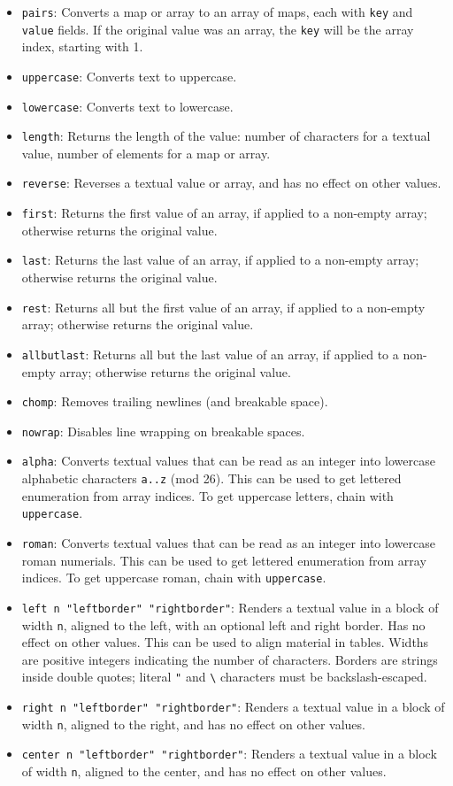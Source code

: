 \documentclass[]{article}
\begin{document}
\begin{itemize}
\item
  \texttt{pairs}: Converts a map or array to an array of maps, each with
  \texttt{key} and \texttt{value} fields. If the original value was an
  array, the \texttt{key} will be the array index, starting with 1.
\item
  \texttt{uppercase}: Converts text to uppercase.
\item
  \texttt{lowercase}: Converts text to lowercase.
\item
  \texttt{length}: Returns the length of the value: number of characters
  for a textual value, number of elements for a map or array.
\item
  \texttt{reverse}: Reverses a textual value or array, and has no effect
  on other values.
\item
  \texttt{first}: Returns the first value of an array, if applied to a
  non-empty array; otherwise returns the original value.
\item
  \texttt{last}: Returns the last value of an array, if applied to a
  non-empty array; otherwise returns the original value.
\item
  \texttt{rest}: Returns all but the first value of an array, if applied
  to a non-empty array; otherwise returns the original value.
\item
  \texttt{allbutlast}: Returns all but the last value of an array, if
  applied to a non-empty array; otherwise returns the original value.
\item
  \texttt{chomp}: Removes trailing newlines (and breakable space).
\item
  \texttt{nowrap}: Disables line wrapping on breakable spaces.
\item
  \texttt{alpha}: Converts textual values that can be read as an integer
  into lowercase alphabetic characters \texttt{a..z} (mod 26). This can
  be used to get lettered enumeration from array indices. To get
  uppercase letters, chain with \texttt{uppercase}.
\item
  \texttt{roman}: Converts textual values that can be read as an integer
  into lowercase roman numerials. This can be used to get lettered
  enumeration from array indices. To get uppercase roman, chain with
  \texttt{uppercase}.
\item
  \texttt{left\ n\ "leftborder"\ "rightborder"}: Renders a textual value
  in a block of width \texttt{n}, aligned to the left, with an optional
  left and right border. Has no effect on other values. This can be used
  to align material in tables. Widths are positive integers indicating
  the number of characters. Borders are strings inside double quotes;
  literal \texttt{"} and \texttt{\textbackslash{}} characters must be
  backslash-escaped.
\item
  \texttt{right\ n\ "leftborder"\ "rightborder"}: Renders a textual
  value in a block of width \texttt{n}, aligned to the right, and has no
  effect on other values.
\item
  \texttt{center\ n\ "leftborder"\ "rightborder"}: Renders a textual
  value in a block of width \texttt{n}, aligned to the center, and has
  no effect on other values.
\end{itemize}
\end{document}
